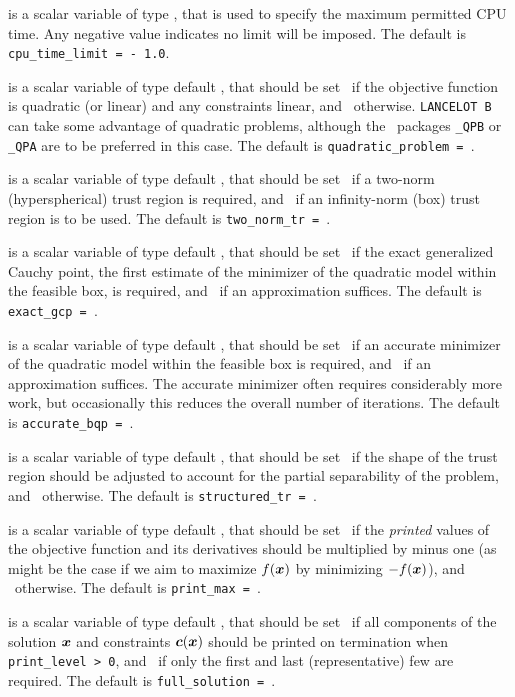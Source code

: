 \documentclass{galahad}
\newcommand{\packagename}{LANCELOT B}
\begin{document}
\begin{description}
 is a scalar variable of type \realdp,
that is used to specify the maximum permitted CPU time. Any negative
value indicates no limit will be imposed. The default is
{\tt cpu\_time\_limit = - 1.0}.

 is a scalar variable of type default \logical, that
should be set \true\ if the objective function is quadratic (or linear)
and any constraints linear, and \false\ otherwise. {\tt \packagename} can
take some advantage of quadratic problems, although the \galahad\ packages
{\tt \libraryname\_QPB} or {\tt \libraryname\_QPA} are to be preferred
in this case.
The default is {\tt quadratic\_problem = \false}.

 is a scalar variable of type default \logical, that should
be set \true\ if a two-norm (hyperspherical) trust region is
required, and \false\ if an infinity-norm (box)
trust region is to be used.
The default is {\tt two\_norm\_tr = \false}.

 is a scalar variable of type default \logical, that should
be set \true\ if the exact generalized Cauchy point,
the first estimate of the minimizer of the quadratic model within
the feasible box, is required, and \false\ if an approximation suffices.
The default is {\tt exact\_gcp = \true}.

 is a scalar variable of type default \logical, that should
be set \true\ if an accurate minimizer of the
quadratic model within the feasible box is required, and
\false\ if an approximation suffices. The accurate minimizer often
requires considerably more work, but occasionally this reduces the overall
number of iterations.
The default is {\tt accurate\_bqp = \false}.

 is a scalar variable of type default \logical, that should
be set \true\ if the shape of the trust region should be adjusted to
account for the partial separability of the problem,
and \false\ otherwise.
The default is {\tt structured\_tr = \false}.

 is a scalar variable of type default \logical, that should
be set \true\ if the {\em printed} values of the objective function and its
derivatives should be multiplied by minus one (as might be the case if
we aim to maximize $f({\bm{x}})$ by minimizing $-f({\bm{x}})$), and \false\ otherwise.
The default is {\tt print\_max = \false}.

 is a scalar variable of type default \logical, that should
be set \true\ if all components of the solution ${\bm{x}}$ and constraints
${\bm{c}}({\bm{x}})$ should be printed on termination when {\tt print\_level > 0},
and \false\ if only the first and last (representative) few are required.
The default is {\tt full\_solution = \true}.


\end{description}
\end{document}

